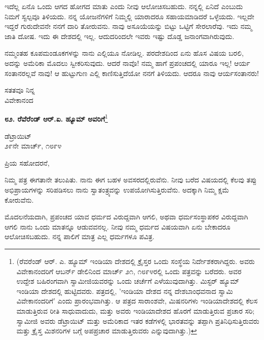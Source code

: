 \vspace{0.1cm}

ಇದೆಲ್ಲ ಏನೊ ಒಂದು ಆಗದ ಹೋಗದ ಮಾತು ಎಂದು ನೀವು ಆಲೋಚಿಸಬಹುದು. ನನ್ನಲ್ಲಿ ಏನಿದೆ ಎಂಬುದು ನಿಮಗೆ ಸ್ವಲ್ಪವೂ ತಿಳಿಯದು. ನನ್ನ ಯೋಜನೆಗಳಿಗೆ ನಿಮ್ಮಲ್ಲಿ ಯಾರಾದರೂ ಸಹಾಯಮಾಡಿದರೆ ಒಳ್ಳೆಯದು. ಇಲ್ಲದೇ ಇದ್ದರೆ ಗುರುದೇವನೇ ನನಗೆ ದಾರಿ ತೋರುವನು. ನಾವು ಅಸೂಯೆಯನ್ನು ಬಿಟ್ಟು ಒಟ್ಟಿಗೆ ಸೇರಲಾರೆವು. ಇದು ನಮ್ಮ ಜಾತಿ ದೋಷ. ಇದು ಈ ದೇಶದಲ್ಲಿ ಇಲ್ಲ. ಆದುದರಿಂದಲೇ ಇವರು ಇಷ್ಟು ದೊಡ್ಡ ಜನಾಂಗವಾಗಿರುವುದು.

\vspace{0.1cm}

ನಮ್ಮಂತಹ ಕೂಪಮಂಡೂಕಗಳನ್ನು ನಾನು ಎಲ್ಲಿಯೂ ನೋಡಿಲ್ಲ. ಪರದೇಶದಿಂದ ಏನು ಹೊಸ ವಿಷಯ ಬರಲಿ, ಅದನ್ನು ಅಮೆರಿಕಾ ಮೊದಲು ಸ್ವೀಕರಿಸುವುದು. ಆದರೆ ನಾವೊ! ನಮ್ಮ ಹಾಗೆ ಪ್ರಪಂಚದಲ್ಲಿ ಯಾರೂ ಇಲ್ಲ! ಆರ್ಯ ಸಂತಾನರಲ್ಲವೆ ನಾವು! ಆ ಹುಟ್ಟುಗುಣ ಎಲ್ಲಿ ಕಾಣಿಸುತ್ತಿದೆಯೋ ನನಗೆ ತಿಳಿಯದು. ಆದರೂ ನಾವು ಆರ್ಯಸಂತಾನರು!

{\flushright
ಸತತವೂ ನಿನ್ನ\\ವಿವೇಕಾನಂದ\par}

\begin{center}
\textbf{೮೨. ರೆವೆರೆಂಡ್ ಆರ್.ಏ. ಹ್ಯೂಮ್ ಅವರಿಗೆ}\footnote{(ರೆವರೆಂಡ್ ಆರ್. ಎ. ಹ್ಯೂಮ್ ಇಂಡಿಯಾ ದೇಶದಲ್ಲಿ ಕ್ರೈಸ್ತರ ಒಂದು ಸಂಸ್ಥೆಯ ನಿರ್ದೇಶಕರಾಗಿದ್ದರು. ಅವರು ವಿವೇಕಾನಂದರಿಗೆ ಆಬರ್ನ್ ಡೇಲಿನಿಂದ ಮಾರ್ಚ್ ೨೧, ೧೮೯೪ರಲ್ಲಿ ಒಂದು ಪತ್ರವನ್ನು ಬರೆದರು. ಅವರ ಉದ್ದೇಶ ಬಹಿರಂಗವಾಗಿ ಸ್ವಾಮೀಜಿಯವರನ್ನು ಒಂದು ಚರ್ಚೆಗೆ ಎಳೆಯುವುದಾಗಿತ್ತು. ಮಿಸ್ಟರ್ ಹ್ಯೂಮ್ ಇಂಡಿಯಾ ದೇಶದಲ್ಲಿ ಹುಟ್ಟಿದವರು. ಪತ್ರದಲ್ಲಿ, 'ಇಂಡಿಯಾ ದೇಶದ ನನ್ನ ದೇಶಬಾಂಧವನಾದ ಸ್ವಾಮಿ ವಿವೇಕಾನಂದರಿಗೆ' ಎಂದು ಪ್ರಾರಂಭವಾಗಿತ್ತು. ಆ ಪತ್ರದ ಸಾರಾಂಶವೇ, ಮಿಷನರಿಗಳು ಇಂಡಿಯಾದೇಶದಲ್ಲಿ ಕೆಲಸ ಮಾಡುತ್ತಿರುವ ರೀತಿ ಸಾಧುವಾದುದು, ಮತ್ತು ಅವರು ಇಂಡಿಯಾದೇಶದ ಹೊರಗೆ ಮಾಡುತ್ತಿರುವ ಪ್ರಚಾರ ಸರಿ; ಸ್ವಾಮೀಜಿ ಅವರು ಡೆಟ್ರಾಯಿಟ್ ಮತ್ತು ಅಮೆರಿಕಾದ ಇತರ ಕಡೆಗಳಲ್ಲಿ ಭಾರತವನ್ನು ತಪ್ಪಾಗಿ ಪ್ರತಿನಿಧಿಸುತ್ತಿರುವರು ಮತ್ತು ಕ್ರೈಸ್ತ ಮಿಶನರಿಗಳ ಬಗ್ಗೆ ಅಪಪ್ರಚಾರ ಮಾಡುತ್ತಿರುವರು ಎನ್ನುವುದಾಗಿತ್ತು.)

}
\end{center}

\begin{flushright}
ಡೆಟ್ರಾಯಿಟ್\\೨೯ನೇ ಮಾರ್ಚ್, ೧೮೯೪
\end{flushright}

\noindent
ಪ್ರಿಯ ಸಹೋದರನೆ,

ನಿಮ್ಮ ಪತ್ರ ಈಗತಾನೇ ತಲುಪಿತು. ನಾನು ಈಗ ಬಹಳ ಅವಸರದಲ್ಲಿರುವೆನು. ನೀವು ಬರೆದ ವಿಷಯದಲ್ಲಿ ಕೆಲವು ತಪ್ಪು ಅಭಿಪ್ರಾಯಗಳನ್ನು ಸರಿಪಡಿಸಲು ನಾನು ಸ್ವಾತಂತ್ರ್ಯವನ್ನು ಉಪಯೋಗಿಸುತ್ತಿರುವೆನು. ಅದಕ್ಕಾಗಿ ನಿಮ್ಮ ಕ್ಷಮೆ ಕೋರುವೆನು.

ಮೊದಲನೆಯದಾಗಿ, ಪ್ರಪಂಚದ ಯಾವ ಧರ್ಮದ ವಿರುದ್ದವಾಗಿ ಆಗಲಿ, ಅಥವಾ ಧರ್ಮಸಂಸ್ಥಾಪಕರ ವಿರುದ್ದವಾಗಿ ಆಗಲಿ ನಾನು ಒಂದು ಮಾತನ್ನೂ ಆಡುವವನಲ್ಲ. ನೀವು ನಮ್ಮ ಧರ್ಮದ ವಿಷಯವಾಗಿ ಏನು ಬೇಕಾದರೂ ಆಲೋಚಿಸಬಹುದು. ನನ್ನ ಪಾಲಿಗೆ ಮಾತ್ರ ಎಲ್ಲ ಧರ್ಮಗಳೂ ಪವಿತ್ರ.

